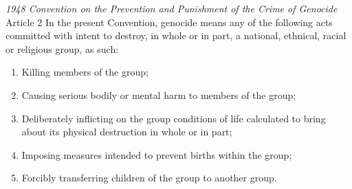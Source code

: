 \begin{conventiondetails}{\textit{1948 Convention on the Prevention and Punishment of the Crime of Genocide} Article 2}
    \flushleft
    In the present Convention, genocide means any of the following acts committed with intent to destroy, in whole or in part, a national, ethnical, racial or religious group, as such: 
    \begin{enumerate}[label=(\alph*)]
        \item Killing members of the group; 
        \item Causing serious bodily or mental harm to members of the group; 
        \item Deliberately inflicting on the group conditions of life calculated to bring about its physical destruction in whole or in part; 
        \item Imposing measures intended to prevent births within the group; 
        \item Forcibly transferring children of the group to another group.
    \end{enumerate}
\end{conventiondetails}

